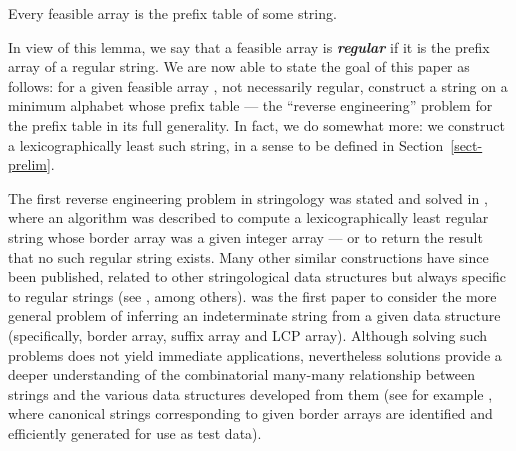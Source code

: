 \documentclass[runningheads,a4paper]{llncs}
\def\qedbox#1#2{\vbox{\hrule height.2pt
  \hbox{\vrule width.2pt height#2pt \kern#1pt \vrule width.2pt}
  \hrule height.2pt}}
\def\qed{\hfill \quad\qedbox46\newline\smallbreak}
\def\s#1{\mbox{\boldmath }}
\def\itbf#1{\textit{\textbf{#1}}}
\newif\ifProofs
\begin{document}
\begin{lemma}
\label{lemm-feas}
Every feasible array is the prefix table of some string.
\end{lemma}
\ifProofs
 \begin{proof}
 Consider an undirected graph  whose vertex set  is the set of positions  in a given feasible
 array .  The edge set  consists of the 2-element subsets  such that
 
for every .
We then define \s{x} as follows:
for each non-isolated vertex ,
let  be the set of edges incident with ;
for each isolated vertex , let  be the loop .
Let  where  is the set of loops.
We claim that  is the prefix table of .

To see this, note that for an index  such that ,
Lemma \ref{lemm-easy}(a) is satisfied by construction.
Then suppose that for some  and ,
.
But this contradicts Lemma~\ref{lemm-easy}(b),
and so 

In case , Lemma \ref{lemm-easy}(a) is satisfied vacuously.
Moreover,  is isolated and thus ,
which does not match ; consequently,
Lemma  \ref{lemm-easy}(b) is again satisfied.
Therefore, 
 coincides with the prefix table of , which is a string over the set  of subsets of . \qed
\end{proof}
\fi

In view of this lemma, we say that a feasible array
is \itbf{regular} if it is the prefix array of a regular string.
We are now able to state the goal of this paper as follows:
for a given feasible array ,
not necessarily regular,
construct a string \s{x} on a minimum alphabet
whose prefix table  --- the ``reverse engineering''
problem for the prefix table in its full generality.
In fact, we do somewhat more: we construct a
lexicographically least such string,
in a sense to be defined in Section~\ref{sect-prelim}.

The first reverse engineering problem in stringology was stated and solved
in \cite{FLRS99,FGLR02}, where an algorithm was described
to compute a lexicographically least regular string whose border array was
a given integer array --- or to return the result that no such regular string exists.
Many other similar constructions have since been published,
related to other stringological data structures but always specific to
regular strings (see \cite{BIST03,DLL05,FS06,MNRR13}, among others).
\cite{NRR12} was the first paper to consider the more general problem
of inferring an indeterminate string from a given data structure
(specifically, border array, suffix array and LCP array).
Although solving such problems does not yield immediate applications,
nevertheless solutions provide a deeper understanding of the combinatorial many-many relationship between
strings and the various data structures developed from them
(see for example \cite{MSM99},
where canonical strings corresponding to given border arrays are identified
and efficiently generated for use as test data).
\end{document}

